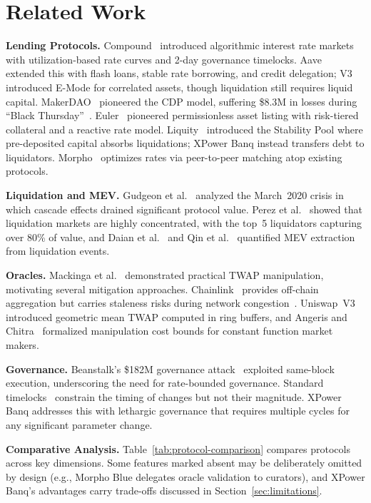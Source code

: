 \documentclass[10pt,a4paper,twocolumn]{article}
\theoremstyle{definition}
\theoremstyle{plain}
\theoremstyle{remark}
\begin{document}
\section{Related Work}
\label{sec:related}

\textbf{Lending Protocols.} Compound~\cite{compound2019} introduced algorithmic interest rate markets with utilization-based rate curves and 2-day governance timelocks. Aave~\cite{aave2020} extended this with flash loans, stable rate borrowing, and credit delegation; V3 introduced E-Mode for correlated assets, though liquidation still requires liquid capital. MakerDAO~\cite{makerdao2017} pioneered the CDP model, suffering \$8.3M in losses during ``Black Thursday''~\cite{gudgeon2020}. Euler~\cite{euler2022} pioneered permissionless asset listing with risk-tiered collateral and a reactive rate model. Liquity~\cite{liquity2021} introduced the Stability Pool where pre-deposited capital absorbs liquidations; XPower Banq instead transfers debt to liquidators. Morpho~\cite{morpho2022} optimizes rates via peer-to-peer matching atop existing protocols.

\textbf{Liquidation and MEV.} Gudgeon et al.~\cite{gudgeon2020} analyzed the March~2020 crisis in which cascade effects drained significant protocol value. Perez et al.~\cite{perez2021} showed that liquidation markets are highly concentrated, with the top~5 liquidators capturing over 80\% of value, and Daian et al.~\cite{daian2020} and Qin et al.~\cite{qin2022} quantified MEV extraction from liquidation events.

\textbf{Oracles.} Mackinga et al.~\cite{mackinga2022} demonstrated practical TWAP manipulation, motivating several mitigation approaches. Chainlink~\cite{chainlink2017} provides off-chain aggregation but carries staleness risks during network congestion~\cite{werner2022}. Uniswap~V3~\cite{uniswap2021} introduced geometric mean TWAP computed in ring buffers, and Angeris and Chitra~\cite{angeris2020} formalized manipulation cost bounds for constant function market makers.

\textbf{Governance.} Beanstalk's \$182M governance attack~\cite{beanstalk2022} exploited same-block execution, underscoring the need for rate-bounded governance. Standard timelocks~\cite{openzeppelin2020} constrain the timing of changes but not their magnitude. XPower Banq addresses this with lethargic governance that requires multiple cycles for any significant parameter change.

\textbf{Comparative Analysis.} Table~\ref{tab:protocol-comparison} compares protocols across key dimensions. Some features marked absent may be deliberately omitted by design (e.g., Morpho Blue delegates oracle validation to curators), and XPower Banq's advantages carry trade-offs discussed in Section~\ref{sec:limitations}.
\end{document}

